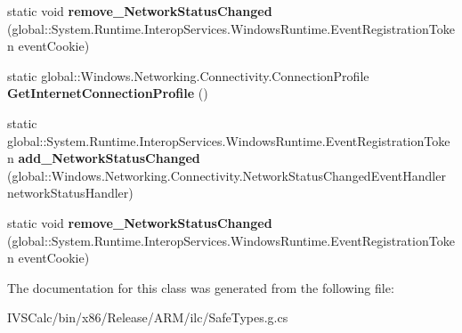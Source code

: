 \begin{DoxyCompactItemize}
\item 
\mbox{\label{class_windows_1_1_networking_1_1_connectivity_1_1_network_information_aad4fa814d8c0a7442a2b4a5a3612769b}} 
static void {\bfseries remove\+\_\+\+Network\+Status\+Changed} (global\+::\+System.\+Runtime.\+Interop\+Services.\+Windows\+Runtime.\+Event\+Registration\+Token event\+Cookie)
\item 
\mbox{\label{class_windows_1_1_networking_1_1_connectivity_1_1_network_information_af317b5fe993850e01a074abcd5e23f43}} 
static global\+::\+Windows.\+Networking.\+Connectivity.\+Connection\+Profile {\bfseries Get\+Internet\+Connection\+Profile} ()
\item 
\mbox{\label{class_windows_1_1_networking_1_1_connectivity_1_1_network_information_a43b6769b13c9e0b4a31e028e8d785cca}} 
static global\+::\+System.\+Runtime.\+Interop\+Services.\+Windows\+Runtime.\+Event\+Registration\+Token {\bfseries add\+\_\+\+Network\+Status\+Changed} (global\+::\+Windows.\+Networking.\+Connectivity.\+Network\+Status\+Changed\+Event\+Handler network\+Status\+Handler)
\item 
\mbox{\label{class_windows_1_1_networking_1_1_connectivity_1_1_network_information_aad4fa814d8c0a7442a2b4a5a3612769b}} 
static void {\bfseries remove\+\_\+\+Network\+Status\+Changed} (global\+::\+System.\+Runtime.\+Interop\+Services.\+Windows\+Runtime.\+Event\+Registration\+Token event\+Cookie)
\end{DoxyCompactItemize}


The documentation for this class was generated from the following file\+:\begin{DoxyCompactItemize}
\item 
I\+V\+S\+Calc/bin/x86/\+Release/\+A\+R\+M/ilc/Safe\+Types.\+g.\+cs\end{DoxyCompactItemize}
